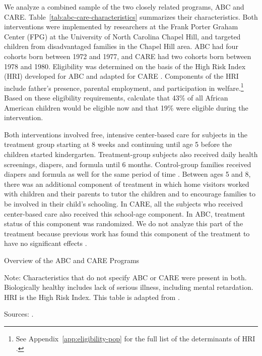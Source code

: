 We analyze a combined sample of the two closely related programs, ABC and CARE. Table~\ref{tab:abc-care-characteristics} summarizes their characteristics. Both interventions were implemented by researchers at the Frank Porter Graham Center (FPG) at the University of North Carolina Chapel Hill, and targeted children from disadvantaged families in the Chapel Hill area. ABC had four cohorts born between 1972 and 1977, and CARE had two cohorts born between 1978 and 1980. Eligibility was determined on the basis of the High Risk Index (HRI) developed for ABC and adapted for CARE \citep{Campbell_Wasik_etal_2008_ECRQ}. Components of the HRI include father's presence, parental employment, and participation in welfare.\footnote{See Appendix~\ref{app:eligibility-pop} for the full list of the determinants of HRI \citep{Ramey_Smith_1977_AJMD, Wasik_Ramey_etal_1990_CD, Ramey_Campbell_1991_childreninpoverty}.} Based on these eligibility requirements, \citet{Garcia_Heckman_Leaf_etal_2017_Comp_CBA_Unpublished} calculate that 43\% of all African American children would be eligible now and that 19\% were eligible during the intervention.

Both interventions involved free, intensive center-based care for subjects in the treatment group starting at 8 weeks and continuing until age 5 before the children started kindergarten. Treatment-group subjects also received daily health screenings, diapers, and formula until 6 months. Control-group families received diapers and formula as well for the same period of time \citep{Wasik_Ramey_etal_1990_CD,Ramey_Campbell_1991_childreninpoverty}. Between ages 5 and 8, there was an additional component of treatment in which home visitors worked with children and their parents to tutor the children and to encourage families to be involved in their child's schooling. In CARE, all the subjects who received center-based care also received this school-age component. In ABC, treatment status of this component was randomized. We do not analyze this part of the treatment because previous work has found this component of the treatment to have no significant effects \citep{Campbell_Ramey_etal_2002_ADS,Campbell_Conti_etal_2014_EarlyChildhoodInvestments}.

\begin{table}[H]
\centering
\caption{Overview of the ABC and CARE Programs}
\label{tab:abc-care-characteristics}
\begin{threeparttable}
	
\begin{tablenotes}
\footnotesize
\item Note: Characteristics that do not specify ABC or CARE were present in both. Biologically healthy includes lack of serious illness, including mental retardation. HRI is the High Risk Index. This table is adapted from \citet{Elango_Hojman_etal_2016_Early-Edu}. \\
\item Sources: \citet{Ramey_Collier_etal_1976_CarolinaAbecedarianProject,Ramey_Smith_1977_AJMD,Ramey_etal_1985_Project-CARE_TiECSE,Wasik_Ramey_etal_1990_CD,Ramey_Campbell_1991_childreninpoverty}. 
\end{tablenotes}
\end{threeparttable}
\end{table}

